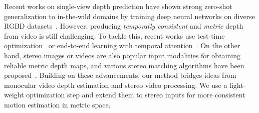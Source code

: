 Recent works on single-view depth prediction have shown strong zero-shot generalization to in-the-wild domains by training deep neural networks on diverse RGBD datasets~\cite{li2018megadepth, li2019learning, ranftl2021vision, yin2021learning, ranftl2020towards, ke2024repurposing, depthanything, yang2024depth, yin2023metric3d, piccinelli2024unidepth}. However, producing \textit{temporally consistent} and \textit{metric} depth from video is still challenging. To tackle this, recent works use test-time optimization~\cite{luo2020consistent, zhang2022structure} or end-to-end learning with temporal attention~\cite{kopf2021rcvd, hu2024depthcrafter, shao2024learning,NVDS}.
On the other hand, stereo images or videos are also popular input modalities for obtaining reliable metric depth maps, and various stereo matching algorithms have been proposed~\cite{birchfield1999depth, hirschmuller2002real, van2002hierarchical, klaus2006segment, sun2003stereo, pang2017cascade, chang2018pyramid, kendall2017end, zhang2019ga, li2023temporally, zhang2023temporalstereo, karaev2023dynamicstereo, jing2024matchstereovideos, wang2025sea}.
Building on these advancements, our method bridges ideas from monocular video depth estimation and stereo video processing. We use a light-weight optimization step and extend them to stereo inputs for more consistent motion estimation in metric space.




	

